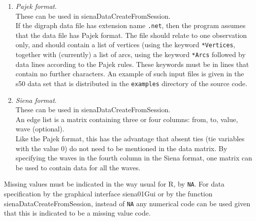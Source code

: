 \documentclass[a4paper,fleqn,11pt]{article}
\newcommand{\+}{\, + \,}
\newcommand{\sfn}[1]{\textsf{#1}}
\newcommand{\Rn}{{\sf R}}
\begin{document}
{\begin{enumerate}
      The values of the ties must be 0, 1, or \texttt{NA}
      (not available = missing);
      or 10 or 11 for structurally determined values (see below).
    \item \emph{Pajek format}.\\
      These can be used in \sfn{sienaDataCreateFromSession}.\\
      If the digraph data file has extension name \texttt{.net}, then the
      program assumes that the data file has Pajek format.
      The file should relate to one observation only,
      and should contain a list of vertices (using the
      keyword \texttt{*Vertices}, together with (currently) a list of arcs,
      using the keyword \texttt{*Arcs}
      followed by data lines according to the Pajek rules.
      These keywords must be in lines that contain no further characters.
      An example of such input files is given in the s50 data set
      that is distributed in the \texttt{examples} directory of the
      source code.
    \item \emph{Siena format}.\\
      These can be used in \sfn{sienaDataCreateFromSession}.\\
      An edge list is a matrix containing three or four columns:
      from, to, value, wave (optional).\\
      Like the Pajek format, this has the advantage that absent ties (tie
      variables with the value 0) do not need to be mentioned in the data
      matrix. By specifying the waves in the fourth column in the
      \sfn{Siena} format, one matrix can be used to contain data for all
      the waves.

\end{enumerate}

Missing values must be indicated in the way usual for \Rn,
by \texttt{NA}.
For data specification by the graphical interface \textsf{siena01Gui}
or by the function \textsf{sienaDataCreateFromSession},
instead of \texttt{NA} any numerical code can be used
given that this is indicated to be a missing value code.

}
\end{document}

